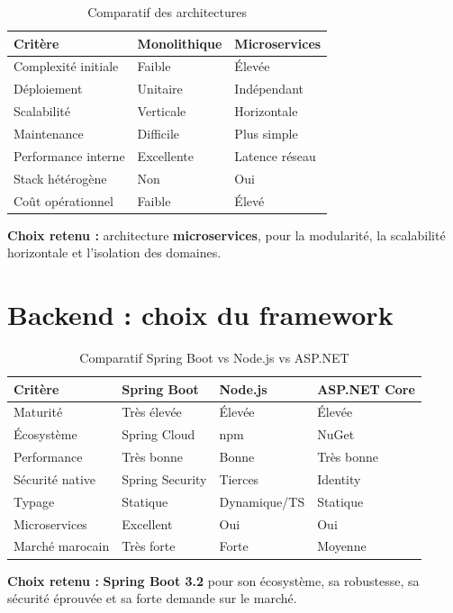 \documentclass[12pt,a4paper,oneside]{report}
\begin{document}
\begin{table}[H]
\centering
\caption{Comparatif des architectures}
\begin{tabular}{lll}
\toprule
\textbf{Critère} & \textbf{Monolithique} & \textbf{Microservices} \\
\midrule
Complexité initiale & Faible & Élevée \\
Déploiement & Unitaire & Indépendant \\
Scalabilité & Verticale & Horizontale \\
Maintenance & Difficile & Plus simple \\
Performance interne & Excellente & Latence réseau \\
Stack hétérogène & Non & Oui \\
Coût opérationnel & Faible & Élevé \\
\bottomrule
\end{tabular}
\end{table}

\textbf{Choix retenu :} architecture \textbf{microservices}, pour la modularité, la scalabilité horizontale et l'isolation des domaines.

\section{Backend : choix du framework}

\begin{table}[H]
\centering
\caption{Comparatif Spring Boot vs Node.js vs ASP.NET}
\begin{tabular}{llll}
\toprule
\textbf{Critère} & \textbf{Spring Boot} & \textbf{Node.js} & \textbf{ASP.NET Core} \\
\midrule
Maturité & Très élevée & Élevée & Élevée \\
Écosystème & Spring Cloud & npm & NuGet \\
Performance & Très bonne & Bonne & Très bonne \\
Sécurité native & Spring Security & Tierces & Identity \\
Typage & Statique & Dynamique/TS & Statique \\
Microservices & Excellent & Oui & Oui \\
Marché marocain & Très forte & Forte & Moyenne \\
\bottomrule
\end{tabular}
\end{table}

\textbf{Choix retenu :} \textbf{Spring Boot 3.2} pour son écosystème, sa robustesse, sa sécurité éprouvée et sa forte demande sur le marché.
\end{document}
